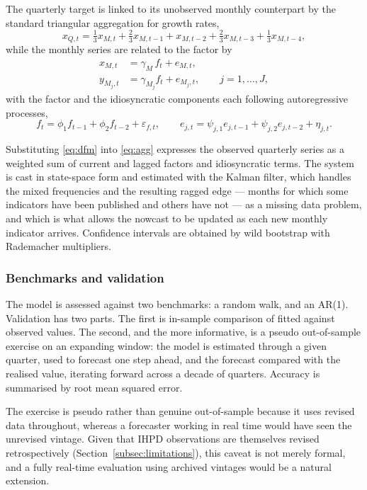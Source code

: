 The quarterly target is linked to its unobserved monthly counterpart by the
standard triangular aggregation for growth rates,
\begin{equation}
  \label{eq:agg}
  x_{Q,t} = \tfrac{1}{3} x_{M,t} + \tfrac{2}{3} x_{M,t-1} + x_{M,t-2}
          + \tfrac{2}{3} x_{M,t-3} + \tfrac{1}{3} x_{M,t-4},
\end{equation}
while the monthly series are related to the factor by
\begin{align}
  \label{eq:dfm}
  x_{M,t}   &= \gamma_{M}\, f_t + e_{M,t},  \\
  y_{M_j,t} &= \gamma_{M_j} f_t + e_{M_j,t}, \qquad j = 1, \dots, J,
\end{align}
with the factor and the idiosyncratic components each following autoregressive
processes,
\begin{equation}
  \label{eq:dfm-dynamics}
  f_t = \phi_1 f_{t-1} + \phi_2 f_{t-2} + \varepsilon_{f,t},
  \qquad
  e_{j,t} = \psi_{j,1} e_{j,t-1} + \psi_{j,2} e_{j,t-2} + \eta_{j,t}.
\end{equation}

Substituting \eqref{eq:dfm} into \eqref{eq:agg} expresses the observed
quarterly series as a weighted sum of current and lagged factors and
idiosyncratic terms. The system is cast in state-space form and estimated
with the Kalman filter, which handles the mixed frequencies and the resulting
ragged edge --- months for which some indicators have been published and
others have not --- as a missing data problem, and which is what allows the
nowcast to be updated as each new monthly indicator arrives. Confidence
intervals are obtained by wild bootstrap with Rademacher multipliers.

\subsubsection{Benchmarks and validation}

The model is assessed against two benchmarks: a random walk, and an AR(1).
Validation has two parts. The first is in-sample comparison of fitted against
observed values. The second, and the more informative, is a pseudo
out-of-sample exercise on an expanding window: the model is estimated through
a given quarter, used to forecast one step ahead, and the forecast compared
with the realised value, iterating forward across a decade of quarters.
Accuracy is summarised by root mean squared error.

The exercise is pseudo rather than genuine out-of-sample because it uses
revised data throughout, whereas a forecaster working in real time would have
seen the unrevised vintage. Given that IHPD observations are themselves
revised retrospectively (Section~\ref{subsec:limitations}), this caveat is
not merely formal, and a fully real-time evaluation using archived vintages
would be a natural extension.


